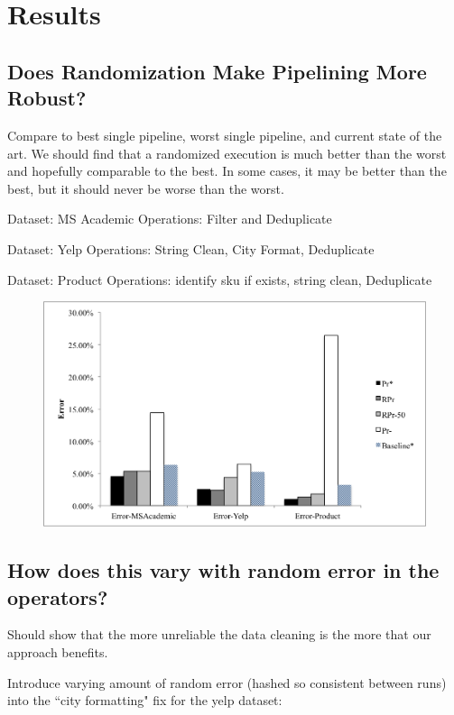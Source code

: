 \section{Results}

\subsection{Does Randomization Make Pipelining More Robust?}
Compare to best single pipeline, worst single pipeline, and current state of the art.
We should find that a randomized execution is much better than the worst and hopefully comparable to the best.
In some cases, it may be better than the best, but it should never be worse than the worst.

Dataset: MS Academic 
Operations: Filter and Deduplicate

Dataset: Yelp 
Operations: String Clean, City Format, Deduplicate

Dataset: Product 
Operations: identify sku if exists, string clean, Deduplicate

\begin{figure}[ht]
\centering
\includegraphics[scale=0.4]{fig1.png}
\caption{}
\label{exp:ms-academic-ranking}
\end{figure}

\subsection{How does this vary with random error in the operators?}
Should show that the more unreliable the data cleaning is the more that our approach benefits.

Introduce varying amount of random error (hashed so consistent between runs) into the ``city formatting" fix for the yelp dataset:

